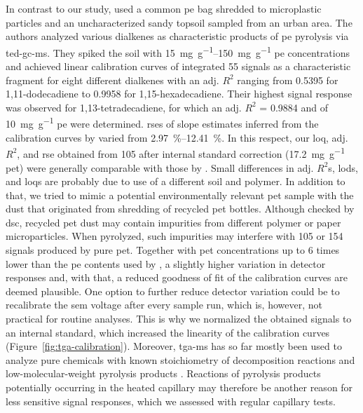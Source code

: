 In contrast to our study, \citet{DumichenFast2017} used a common \ac{pe} bag shredded to microplastic particles and an uncharacterized sandy topsoil sampled from an urban area. The authors analyzed various dialkenes as characteristic products of \ac{pe} pyrolysis via \ac{ted-gc-ms}. They spiked the soil with \SIrange[range-phrase = { to }]{15}{150}{\milli\gram\per\gram} \ac{pe} concentrations and achieved linear calibration curves of integrated \SI{55}{\mz} signals as a characteristic fragment for eight different dialkenes with an adj. $R^2$ ranging from \num{0.5395} for 1,11-dodecadiene to \num{0.9958} for 1,15-hexadecadiene. Their highest signal response was observed for 1,13-tetradecadiene, for which an adj. $R^2$ = \num{0.9884} and  of \SI{10}{\milli\gram\per\gram} \ac{pe} were determined.
\Acp{rse} of slope estimates inferred from the calibration curves by \citet{DumichenAnalysis2015} varied from \SIrange[range-phrase = { to }]{2.97}{12.41}{\percent}. In this respect, our \ac{loq}, adj. $R^2$, and \ac{rse} obtained from \SI{105}{\mz} after internal standard correction (\SI{17.2}{\milli\gram\per\gram} \ac{pet}) were generally comparable with those by \citet{DumichenAnalysis2015}.
Small differences in adj. $R^2$s, \acp{lod}, and \acp{loq} are probably due to use of a different soil and polymer. In addition to that, we tried to mimic a potential environmentally relevant \ac{pet} sample with the dust that originated from shredding of recycled \ac{pet} bottles.
Although checked by \ac{dsc}, recycled \ac{pet} dust may contain impurities from different polymer or paper microparticles.
When pyrolyzed, such impurities may interfere with \num{105} or \SI{154}{\mz} signals produced by pure \ac{pet}.
Together with \ac{pet} concentrations up to \num{6} times lower than the \ac{pe} contents used by \citet{DumichenAnalysis2015}, a slightly higher variation in detector responses and, with that, a reduced goodness of fit of the calibration curves are deemed plausible. One option to further reduce detector variation could be to recalibrate the \ac{sem} voltage after every sample run, which is, however, not practical for routine analyses. This is why we normalized the obtained signals to an internal standard, which increased the linearity of the calibration curves (Figure~\ref{fig:tga-calibration}).
Moreover, \ac{tga-ms} has so far mostly been used to analyze pure chemicals with known stoichiometry of decomposition reactions and low-molecular-weight pyrolysis products \citep{HotovaQuantitative2016}. Reactions of pyrolysis products potentially occurring in the heated capillary may therefore be another reason for less sensitive signal responses, which we assessed with regular capillary tests.

